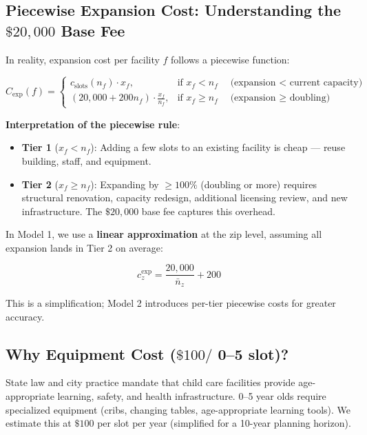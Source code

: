 \documentclass[12pt]{article}
\begin{document}
\subsection{Piecewise Expansion Cost: Understanding the $\$20{,}000$ Base Fee}

In reality, expansion cost per facility $f$ follows a piecewise function:

\begin{equation}
C_{\exp}(f) = \begin{cases}
c_{\text{slots}}(n_f) \cdot x_f, & \text{if } x_f < n_f \quad \text{(expansion $<$ current capacity)} \\
\left(20{,}000 + 200n_f\right) \cdot \frac{x_f}{n_f}, & \text{if } x_f \geq n_f \quad \text{(expansion $\geq$ doubling)}
\end{cases}
\label{eq:piecewise_cost}
\end{equation}

\textbf{Interpretation of the piecewise rule}:

\begin{itemize}
    \item \textbf{Tier 1} ($x_f < n_f$): Adding a few slots to an existing facility is cheap — reuse building, staff, and equipment.
    
    \item \textbf{Tier 2} ($x_f \geq n_f$): Expanding by $\geq 100\%$ (doubling or more) requires structural renovation, 
    capacity redesign, additional licensing review, and new infrastructure. The $\$20{,}000$ base fee captures this overhead.
\end{itemize}

\noindent
In Model 1, we use a \textbf{linear approximation} at the zip level, assuming all expansion lands in Tier 2 on average:

\begin{equation}
c_z^{\text{exp}} = \frac{20{,}000}{\bar{n}_z} + 200
\end{equation}

\noindent
This is a simplification; Model 2 introduces per-tier piecewise costs for greater accuracy.

\subsection{Why Equipment Cost ($\$100/$ 0--5 slot)?}

State law and city practice mandate that child care facilities provide age-appropriate learning, safety, and 
health infrastructure. 0--5 year olds require specialized equipment (cribs, changing tables, age-appropriate learning tools). 
We estimate this at $\$100$ per slot per year (simplified for a 10-year planning horizon). 
\end{document}
